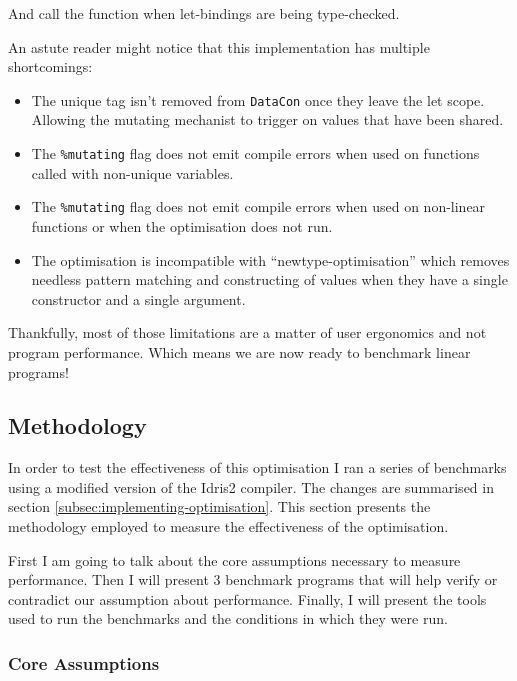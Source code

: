 \documentclass[
]{article}
\providecommand{\tightlist}{%
  \setlength{\itemsep}{0pt}\setlength{\parskip}{0pt}}
\begin{document}
And call the function when let-bindings are being type-checked.

An astute reader might notice that this implementation has multiple
shortcomings:

\begin{itemize}
\tightlist
\item
  The unique tag isn't removed from \texttt{DataCon} once they leave the
  let scope. Allowing the mutating mechanist to trigger on values that
  have been shared.
\item
  The \texttt{\%mutating} flag does not emit compile errors when used on
  functions called with non-unique variables.
\item
  The \texttt{\%mutating} flag does not emit compile errors when used on
  non-linear functions or when the optimisation does not run.
\item
  The optimisation is incompatible with ``newtype-optimisation'' which
  removes needless pattern matching and constructing of values when they
  have a single constructor and a single argument.
\end{itemize}

Thankfully, most of those limitations are a matter of user ergonomics
and not program performance. Which means we are now ready to benchmark
linear programs!

\hypertarget{methodology}{%
\subsection{Methodology}\label{methodology}}

In order to test the effectiveness of this optimisation I ran a series
of benchmarks using a modified version of the Idris2 compiler. The
changes are summarised in section
\ref{subsec:implementing-optimisation}. This section presents the
methodology employed to measure the effectiveness of the optimisation.

First I am going to talk about the core assumptions necessary to measure
performance. Then I will present 3 benchmark programs that will help
verify or contradict our assumption about performance. Finally, I will
present the tools used to run the benchmarks and the conditions in which
they were run.

\hypertarget{core-assumptions}{%
\subsubsection{Core Assumptions}\label{core-assumptions}}
\end{document}
